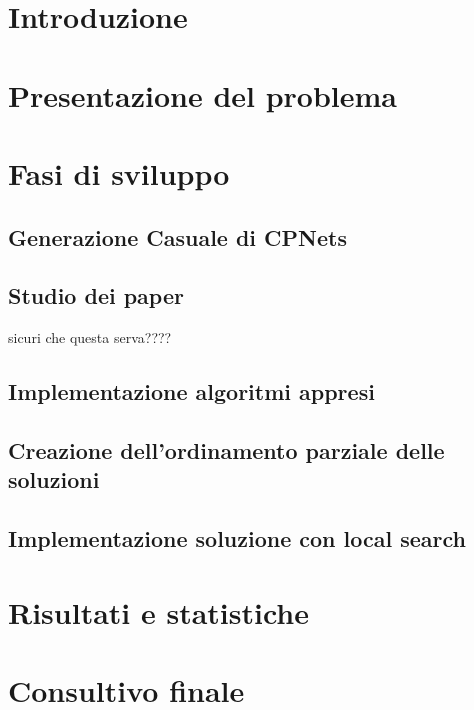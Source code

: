 \documentclass[a4paper,titlepage]{article}
\begin{document}
\tableofcontents

\newpage

\section{Introduzione}



\section{Presentazione del problema}


\section{Fasi di sviluppo}

\subsection{Generazione Casuale di CPNets}
\subsection{Studio dei paper} 

sicuri che questa serva????
\subsection{Implementazione algoritmi appresi}
\subsection{Creazione dell'ordinamento parziale delle soluzioni}
\subsection{Implementazione soluzione con local search}

\section{Risultati e statistiche}

\section{Consultivo finale}
\end{document}
